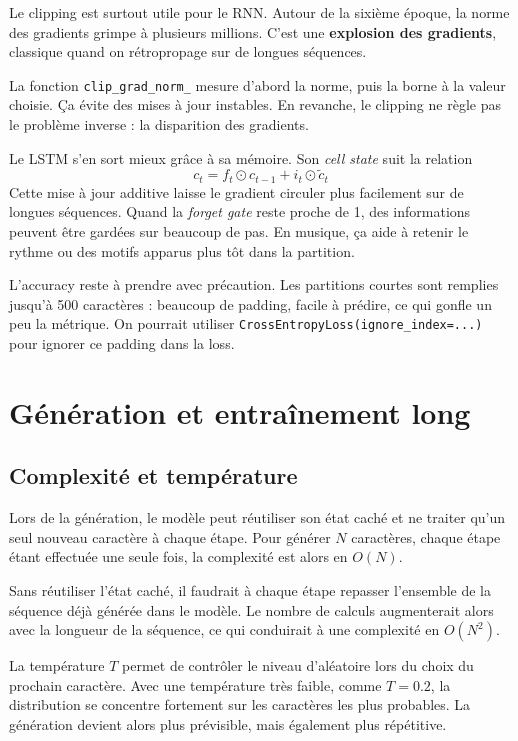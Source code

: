 \documentclass[11pt,a4paper]{article}
\begin{document}
Le clipping est surtout utile pour le RNN. Autour de la sixième époque,
la norme des gradients grimpe à plusieurs millions. C'est une
\textbf{explosion des gradients}, classique quand on rétropropage sur
de longues séquences.

La fonction \texttt{clip\_grad\_norm\_} mesure d'abord la norme, puis
la borne à la valeur choisie. Ça évite des mises à jour instables.
En revanche, le clipping ne règle pas le problème inverse : la
disparition des gradients.

Le LSTM s'en sort mieux grâce à sa mémoire. Son \emph{cell state}
suit la relation
\[
c_t = f_t \odot c_{t-1} + i_t \odot \tilde{c}_t
\]
Cette mise à jour additive laisse le gradient circuler plus facilement
sur de longues séquences. Quand la \emph{forget gate} reste proche de 1,
des informations peuvent être gardées sur beaucoup de pas. En musique,
ça aide à retenir le rythme ou des motifs apparus plus tôt dans la
partition.

L'accuracy reste à prendre avec précaution. Les partitions courtes
sont remplies jusqu'à 500 caractères : beaucoup de padding, facile à
prédire, ce qui gonfle un peu la métrique. On pourrait utiliser
\texttt{CrossEntropyLoss(ignore\_index=...)} pour ignorer ce padding
dans la loss.

\section{Génération et entraînement long}

\subsection{Complexité et température}

Lors de la génération, le modèle peut réutiliser son état caché et ne
traiter qu'un seul nouveau caractère à chaque étape. Pour générer
$N$ caractères, chaque étape étant effectuée une seule fois, la
complexité est alors en $O(N)$.

Sans réutiliser l'état caché, il faudrait à chaque étape repasser
l'ensemble de la séquence déjà générée dans le modèle. Le nombre de
calculs augmenterait alors avec la longueur de la séquence, ce qui
conduirait à une complexité en $O(N^2)$.

La température $T$ permet de contrôler le niveau d'aléatoire lors du
choix du prochain caractère. Avec une température très faible, comme
$T=0.2$, la distribution se concentre fortement sur les caractères les
plus probables. La génération devient alors plus prévisible, mais
également plus répétitive.
\end{document}
